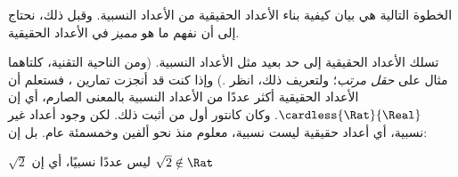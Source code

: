 \documentclass[../../../include/open-logic-section]{subfiles}
\begin{document}

الخطوة التالية هي بيان كيفية بناء الأعداد الحقيقية من الأعداد النسبية.
وقبل ذلك، نحتاج إلى أن نفهم ما هو \emph{مميز} في الأعداد الحقيقية.

تسلك الأعداد الحقيقية إلى حد بعيد مثل الأعداد النسبية. (ومن الناحية التقنية،
كلتاهما مثال على \emph{حقل مرتب}؛ ولتعريف ذلك، انظر
.) وإذا كنت قد أنجزت تمارين
، فستعلم أن الأعداد الحقيقية أكثر عددًا من الأعداد
النسبية بالمعنى الصارم، أي إن $\cardless{\Rat}{\Real}$. وكان كانتور أول من أثبت ذلك.
لكن وجود أعداد غير نسبية، أي أعداد حقيقية ليست نسبية، معلوم منذ نحو ألفين
وخمسمئة عام. بل إن:
\begin{thm}
$\sqrt{2}$ ليس عددًا نسبيًا، أي إن $\sqrt{2} \notin \Rat$
\end{thm}
\end{document}
